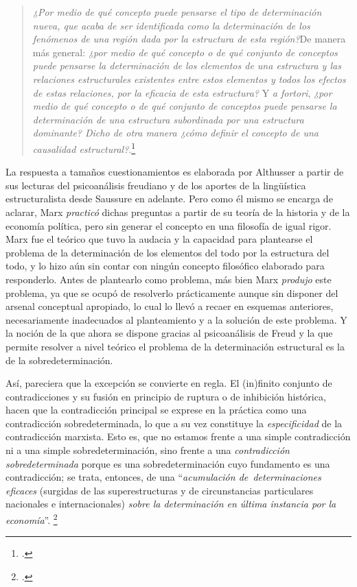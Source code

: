 \begin{quote}
\emph{¿Por medio de qué concepto puede pensarse el tipo de determinación nueva, que acaba de ser identificada como la determinación de los fenómenos de una región dada por la estructura de esta región?}De manera más general: \emph{¿por medio de qué concepto o de qué conjunto de conceptos puede pensarse la determinación de los elementos de una estructura y las relaciones estructurales existentes entre estos elementos y todos los efectos de estas relaciones, por la eficacia de esta estructura?} Y \emph{a fortori}, \emph{¿por medio de qué concepto o de qué conjunto de conceptos puede pensarse la determinación de una estructura subordinada por una estructura dominante? Dicho de otra manera ¿cómo definir el concepto de una causalidad estructural?}.\footcite[][201]{@7051-ALTHUSSER1965}
\end{quote}

La respuesta a tamaños cuestionamientos es elaborada por Althusser a partir de sus lecturas del psicoanálisis freudiano y de los aportes de la lingüística estructuralista desde Saussure en adelante. Pero como él mismo se encarga de aclarar, Marx \emph{practicó} dichas preguntas a partir de su teoría de la historia y de la economía política, pero sin generar el concepto en una filosofía de igual rigor. Marx fue el teórico que tuvo la audacia y la capacidad para plantearse el problema de la determinación de los elementos del todo por la estructura del todo, y lo hizo aún sin contar con ningún concepto filosófico elaborado para responderlo. Antes de plantearlo como problema, más bien Marx \emph{produjo} este problema, ya que se ocupó de resolverlo prácticamente aunque sin disponer del arsenal conceptual apropiado, lo cual lo llevó a recaer en esquemas anteriores, necesariamente inadecuados al planteamiento y a la solución de este problema. Y la noción de la que ahora se dispone gracias al psicoanálisis de Freud y la que permite resolver a nivel teórico el problema de la determinación estructural es la de la sobredeterminación.

Así, pareciera que la excepción se convierte en regla. El (in)finito conjunto de contradicciones y su fusión en principio de ruptura o de inhibición histórica, hacen que la contradicción principal se exprese en la práctica como una contradicción sobredeterminada, lo que a su vez constituye la \emph{especificidad} de la con\-tradicción marxista. Esto es, que no estamos frente a una simple contradicción ni a una simple sobredeterminación, sino frente a una \emph{contradicción sobredeterminada} porque es una sobredeterminación cuyo fundamento es una contradicción; se trata, entonces, de una \enquote{\emph{acumulación de~determinaciones eficaces} (surgidas de las superestructuras y de circunstancias particulares nacionales e internacionales) \emph{sobre la determinación en última instancia por la economía}}. \footcite[][92]{@7051-ALTHUSSER1965}

